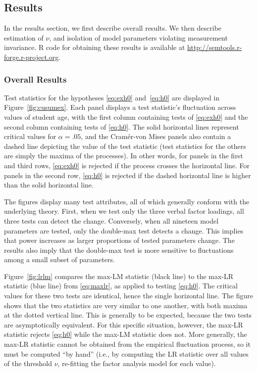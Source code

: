 \documentclass[man]{apa}
\begin{document}
\subsection{Results}
In the results section, we first describe overall results.  We then 
describe estimation of $\nu$, and 
isolation of model parameters violating
measurement invariance.  R code for obtaining these results is
  available at \url{http://semtools.r-forge.r-project.org}.

\subsubsection{Overall Results}
Test statistics for the hypotheses \eqref{eq:exh0} and~\eqref{eq:h0}
are displayed in  
Figure~\ref{fig:cusumex}.
Each panel displays a test 
statistic's fluctuation across values of student age, with the first
column containing tests of \eqref{eq:exh0} and the second column
containing tests of \eqref{eq:h0}.  The solid
horizontal 
lines represent critical values for $\alpha=.05$, and
the Cram\'{e}r-von Mises panels 
also contain a dashed line depicting the value of the test
statistic (test statistics for the others are simply 
the maxima of the processes).
In other words, for panels in the first and third rows, \eqref{eq:exh0} is
rejected if the process crosses the horizontal line.  For panels in
the second row, \eqref{eq:h0} is rejected if the dashed horizontal line is
higher than the solid horizontal line.

The figures display many test attributes, all of which generally
conform with the underlying theory.  First, when we test
only the three verbal factor loadings, all three tests can detect the
change.  Conversely, when all nineteen model parameters are tested,
only the double-max test detects a change.  This implies that 
power increases as larger proportions of tested parameters
change.  The results also imply that the double-max test is more
sensitive to fluctuations among a small subset of parameters.

Figure~\ref{fig:lrlm} 
compares the max-LM statistic (black line) to the max-LR
statistic (blue line) from \eqref{eq:maxlr}, as applied to testing
\eqref{eq:h0}.  The critical values for these two
tests are identical, hence the single horizontal line.
The figure
shows that the two statistics are very similar to one another, with
both maxima at the dotted vertical line.  This
is generally to be expected, because the two tests are asymptotically
equivalent.  For this specific situation, however, the max-LR
statistic rejects \eqref{eq:h0} while the max-LM statistic does not.
More generally, the 
max-LR statistic cannot be obtained from the empirical fluctuation
process, so it must be computed ``by hand'' (i.e., by computing
the LR statistic over all values of the threshold $\nu$, re-fitting the
factor analysis model for each value).
\end{document}
